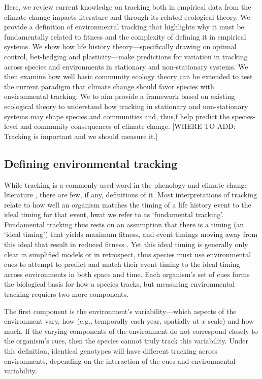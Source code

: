 \documentclass[11pt,letterpaper]{article}
\begin{document}
Here, we review current knowledge on tracking both in empirical data from the climate change impacts literature and through its related ecological theory. We provide a definition of environmental tracking that highlights why it must be fundamentally related to fitness and the complexity of defining it in empirical systems. We show how life history theory---specifically drawing on optimal control, bet-hedging and plasticity---make predictions for variation in tracking across species and environments in stationary and non-stationary systems. We then examine how well basic community ecology theory can be extended to test the current paradigm that climate change should favor species with environmental tracking. We to aim provide a framework based on existing ecological theory to understand how tracking in stationary and non-stationary systems may shape species and communities and, thus,f help predict the species-level and community consequences of climate change. [WHERE TO ADD: Tracking is important and we should measure it.]

\subsection{Defining environmental tracking}
While tracking is a commonly used word in the phenology and climate change literature \citep[e.g.,][]{Menzel:2006xn,Cleland:2012,deacy2018}, there are few, if any, definitions of it. Most interpretations of tracking relate to how well an organism matches the timing of a life history event to the ideal timing for that event, hwat we refer to as `fundamental tracking'. Fundamental tracking thus rests on an assumption that there is a timing (an `ideal timing') that yields maximum fitness, and event timings moving away from this ideal that result in reduced fitness \citep[a foundational concept of the trophic mismatch literature,][]{vissergienapp2019}. Yet this ideal timing is generally only clear in simplified models or in retrospect, thus species must use environmental cues to attempt to predict and match their event timing to the ideal timing across environments in both space and time. Each organism's set of cues forms the biological basis for how a species tracks, but measuring environmental tracking requiers two more components.

The first component is the environment's variability---which aspects of the environment vary, how (e.g., temporally each year, spatially at $x$ scale) and how much. If the varying components of the environment do not correspond closely to the organism's cues, then the species cannot truly track this variability. Under this definition, identical genotypes will have different tracking across environments, depending on the interaction of the cues and environmental variability.
\end{document}

